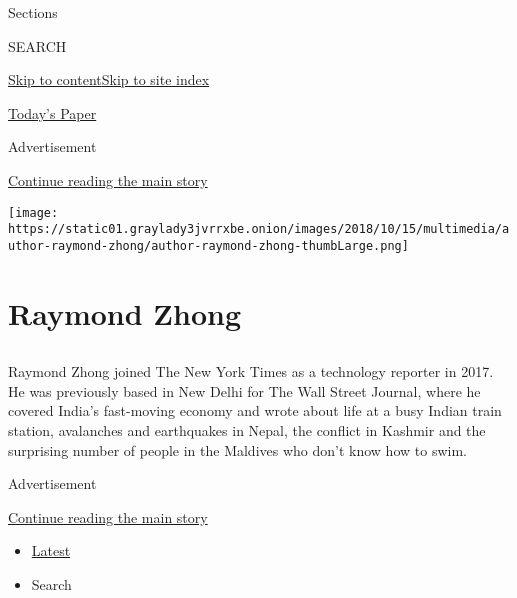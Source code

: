 Sections

SEARCH

\protect\hyperlink{site-content}{Skip to
content}\protect\hyperlink{site-index}{Skip to site index}

\href{https://myaccount.nytimes3xbfgragh.onion/auth/login?response_type=cookie\&client_id=vi}{}

\href{https://www.nytimes3xbfgragh.onion/section/todayspaper}{Today's
Paper}

Advertisement

\protect\hyperlink{after-top}{Continue reading the main story}

\texttt{[image: https://static01.graylady3jvrrxbe.onion/images/2018/10/15/multimedia/author-raymond-zhong/author-raymond-zhong-thumbLarge.png]}

\hypertarget{raymond-zhong}{%
\section{Raymond Zhong}\label{raymond-zhong}}

\hypertarget{section}{%
\subsection{}\label{section}}

Raymond Zhong joined The New York Times as a technology reporter in
2017. He was previously based in New Delhi for The Wall Street Journal,
where he covered India's fast-moving economy and wrote about life at a
busy Indian train station, avalanches and earthquakes in Nepal, the
conflict in Kashmir and the surprising number of people in the Maldives
who don't know how to swim.~

Advertisement

\protect\hyperlink{after-mid1}{Continue reading the main story}

\begin{itemize}
\tightlist
\item
  \protect\hyperlink{stream-panel}{Latest}
\item
  Search
\end{itemize}

